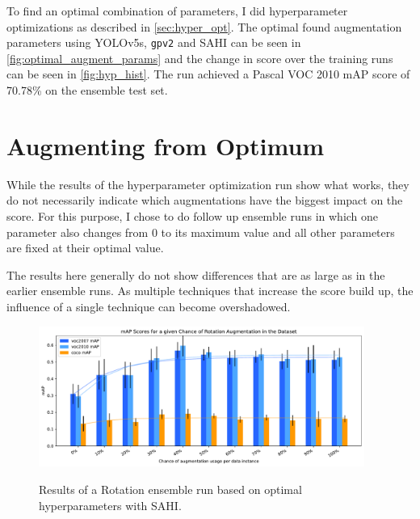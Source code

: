 \documentclass[10pt]{book}
\newcommand{\figureref}[1]{\autoref{#1}}
\begin{document}

To find an optimal combination of parameters, I did hyperparameter optimizations as described in \autoref{sec:hyper_opt}. The optimal found augmentation parameters using \ac{YOLO}v5s, \texttt{gpv2} and \ac{SAHI} can be seen in \figureref{fig:optimal_augment_params} and the change in score over the training runs can be seen in \figureref{fig:hyp_hist}. 
The run achieved a Pascal VOC 2010 \ac{mAP} score of 70.78\% on the ensemble test set.

\section{Augmenting from Optimum}

While the results of the hyperparameter optimization run show what works, they do not necessarily indicate which augmentations have the biggest impact on the score. For this purpose, I chose to do follow up ensemble runs in which one parameter also changes from 0 to its maximum value and all other parameters are fixed at their optimal value.

The results here generally do not show differences that are as large as in the earlier ensemble runs. As multiple techniques that increase the score build up, the influence of a single technique can become overshadowed.

\begin{figure}
  \caption{Results of a Rotation ensemble run based on optimal hyperparameters with \ac{SAHI}.}
  \includegraphics[width=0.95\textwidth]{image/hyp-based-rot-sahi-ensemble-2-thesis-2}
  \label{fig:hyp_based_rot_plot}
\end{figure}
\end{document}
